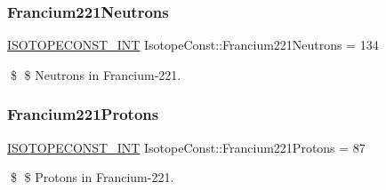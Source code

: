 \subsubsection{\texorpdfstring{Francium221\+Neutrons}{Francium221Neutrons}}
{\footnotesize\ttfamily \mbox{\hyperlink{group___isotope_const-_macros_ga5f18360b3e99483a35c32d789e62621c}{I\+S\+O\+T\+O\+P\+E\+C\+O\+N\+S\+T\+\_\+\+I\+NT}} Isotope\+Const\+::\+Francium221\+Neutrons = 134}

\$ \$ Neutrons in Francium-\/221. \mbox{\label{group___isotope_const-_francium-_fr221_ga55adfe61f528ec40c936ec3f7d341f81}} 
\subsubsection{\texorpdfstring{Francium221\+Protons}{Francium221Protons}}
{\footnotesize\ttfamily \mbox{\hyperlink{group___isotope_const-_macros_ga5f18360b3e99483a35c32d789e62621c}{I\+S\+O\+T\+O\+P\+E\+C\+O\+N\+S\+T\+\_\+\+I\+NT}} Isotope\+Const\+::\+Francium221\+Protons = 87}

\$ \$ Protons in Francium-\/221. 